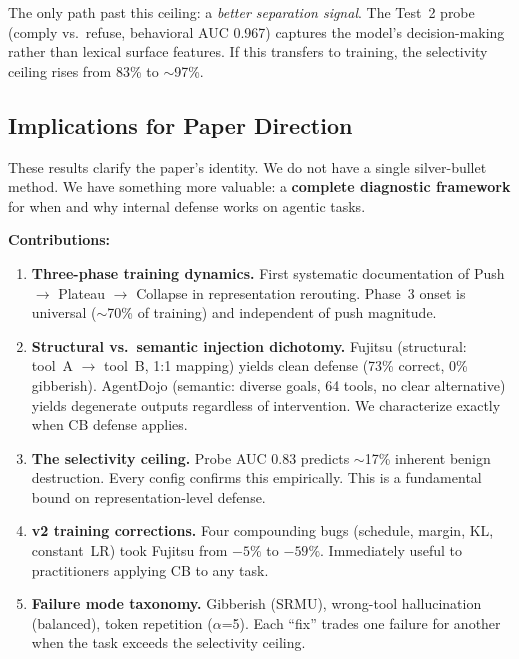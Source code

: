 \documentclass[11pt]{article}
\begin{document}
The only path past this ceiling: a \emph{better separation signal}.  The
Test~2 probe (comply vs.\ refuse, behavioral AUC 0.967) captures the
model's decision-making rather than lexical surface features.  If this
transfers to training, the selectivity ceiling rises from 83\% to $\sim$97\%.

\subsection{Implications for Paper Direction}
\label{sec:sweep11-paper}

These results clarify the paper's identity.  We do not have a single
silver-bullet method.  We have something more valuable: a \textbf{complete
diagnostic framework} for when and why internal defense works on agentic
tasks.

\textbf{Contributions:}
\begin{enumerate}
  \item \textbf{Three-phase training dynamics.}  First systematic
        documentation of Push $\to$ Plateau $\to$ Collapse in representation
        rerouting.  Phase~3 onset is universal ($\sim$70\% of training) and
        independent of push magnitude.

  \item \textbf{Structural vs.\ semantic injection dichotomy.}  Fujitsu
        (structural: tool~A $\to$ tool~B, 1:1 mapping) yields clean defense
        (73\% correct, 0\% gibberish).  AgentDojo (semantic: diverse goals,
        64 tools, no clear alternative) yields degenerate outputs regardless
        of intervention.  We characterize exactly when CB defense applies.

  \item \textbf{The selectivity ceiling.}  Probe AUC 0.83 predicts
        $\sim$17\% inherent benign destruction.  Every config confirms this
        empirically.  This is a fundamental bound on representation-level
        defense.

  \item \textbf{v2 training corrections.}  Four compounding bugs (schedule,
        margin, KL, constant~LR) took Fujitsu from $-5\%$ to $-59\%$.
        Immediately useful to practitioners applying CB to any task.

  \item \textbf{Failure mode taxonomy.}  Gibberish (SRMU), wrong-tool
        hallucination (balanced), token repetition ($\alpha$=5).  Each
        ``fix'' trades one failure for another when the task exceeds the
        selectivity ceiling.
\end{enumerate}
\end{document}
